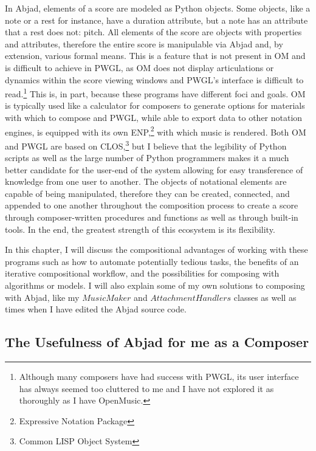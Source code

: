 In Abjad, elements of a score are modeled as Python objects. Some objects, like a note or a rest for instance, have a duration attribute, but a note has an attribute that a rest does not: pitch. All elements of the score are objects with properties and attributes, therefore the entire score is manipulable via Abjad and, by extension, various formal means. This is a feature that is not present in OM and is difficult to achieve in PWGL, as OM does not display articulations or dynamics within the score viewing windows and PWGL’s interface is difficult to read.\footnote{Although many composers have had success with PWGL, its user interface has always seemed too cluttered to me and I have not explored it as thoroughly as I have OpenMusic.} This is, in part, because these programs have different foci and goals. OM is typically used like a calculator for composers to generate options for materials with which to compose and PWGL, while able to export data to other notation engines, is equipped with its own ENP,\footnote{Expressive Notation Package} with which music is rendered. Both OM and PWGL are based on CLOS,\footnote{Common LISP Object System} but I believe that the legibility of Python scripts as well as the large number of Python programmers makes it a much better candidate for the user-end of the system allowing for easy transference of knowledge from one user to another. The objects of notational elements are capable of being manipulated, therefore they can be created, connected, and appended to one another throughout the composition process to create a score through composer-written procedures and functions as well as through built-in tools. In the end, the greatest strength of this ecosystem is its flexibility.

In this chapter, I will discuss the compositional advantages of working with these programs such as how to automate potentially tedious tasks, the benefits of an iterative compositional workflow, and the possibilities for composing with algorithms or models. I will also explain some of my own solutions to composing with Abjad, like my $MusicMaker$ and $AttachmentHandlers$ classes as well as times when I have edited the Abjad source code.

\subsection{The Usefulness of Abjad for me as a Composer}

